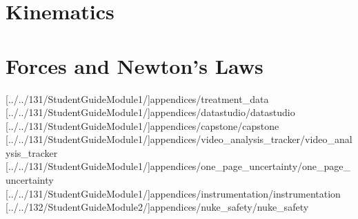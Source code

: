 \documentclass[english,twoside]{article}
\begin{document}


\tableofcontents{}
\cleardoublepage

\part{Kinematics}


\part{Forces and Newton's Laws}



\startappendix

[../../131/StudentGuideModule1/]{appendices/treatment_data}
[../../131/StudentGuideModule1/]{appendices/datastudio/datastudio}
[../../131/StudentGuideModule1/]{appendices/capstone/capstone}
[../../131/StudentGuideModule1/]{appendices/video_analysis_tracker/video_analysis_tracker}
[../../131/StudentGuideModule1/]{appendices/one_page_uncertainty/one_page_uncertainty}
[../../131/StudentGuideModule1/]{appendices/instrumentation/instrumentation}
[../../132/StudentGuideModule2/]{appendices/nuke_safety/nuke_safety}

\ifincludeinstructornotes \startinstructornotes \fi
\end{document}

